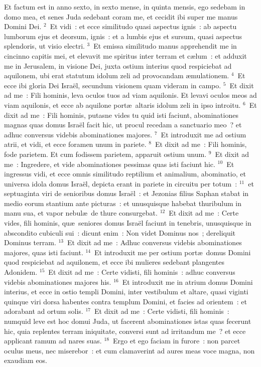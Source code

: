 \lettrine[lines=10,image=true,loversize=0.05,lraise=-0.03]{E}{}t factum est in anno sexto, in sexto mense, in quinta mensis, ego sedebam in domo mea, et senes Juda sedebant coram me, et cecidit ibi super me manus Domini Dei.
${}^{2}$~Et vidi~: et ecce similitudo quasi aspectus ignis~: ab aspectu lumborum ejus et deorsum, ignis~: et a lumbis ejus et sursum, quasi aspectus splendoris, ut visio electri.
${}^{3}$~Et emissa similitudo manus apprehendit me in cincinno capitis mei, et elevavit me spiritus inter terram et c\ae lum~: et adduxit me in Jerusalem, in visione Dei, juxta ostium interius quod respiciebat ad aquilonem, ubi erat statutum idolum zeli ad provocandam \ae mulationem.
${}^{4}$~Et ecce ibi gloria Dei Isra\"el, secundum visionem quam videram in campo.
${}^{5}$~Et dixit ad me~: Fili hominis, leva oculos tuos ad viam aquilonis. Et levavi oculos meos ad viam aquilonis, et ecce ab aquilone port\ae\ altaris idolum zeli in ipso introitu.
${}^{6}$~Et dixit ad me~: Fili hominis, putasne vides tu quid isti faciunt, abominationes magnas quas domus Isra\"el facit hic, ut procul recedam a sanctuario meo~? et adhuc conversus videbis abominationes majores.
${}^{7}$~Et introduxit me ad ostium atrii, et vidi, et ecce foramen unum in pariete.
${}^{8}$~Et dixit ad me~: Fili hominis, fode parietem. Et cum fodissem parietem, apparuit ostium unum.
${}^{9}$~Et dixit ad me~: Ingredere, et vide abominationes pessimas quas isti faciunt hic.
${}^{10}$~Et ingressus vidi, et ecce omnis similitudo reptilium et animalium, abominatio, et universa idola domus Isra\"el, depicta erant in pariete in circuitu per totum~:
${}^{11}$~et septuaginta viri de senioribus domus Isra\"el~: et Jezonias filius Saphan stabat in medio eorum stantium ante picturas~: et unusquisque habebat thuribulum in manu sua, et vapor nebul\ae\ de thure consurgebat.
${}^{12}$~Et dixit ad me~: Certe vides, fili hominis, qu\ae\ seniores domus Isra\"el faciunt in tenebris, unusquisque in abscondito cubiculi sui~: dicunt enim~: Non videt Dominus nos~; dereliquit Dominus terram.
${}^{13}$~Et dixit ad me~: Adhuc conversus videbis abominationes majores, quas isti faciunt.
${}^{14}$~Et introduxit me per ostium port\ae\ domus Domini quod respiciebat ad aquilonem, et ecce ibi mulieres sedebant plangentes Adonidem.
${}^{15}$~Et dixit ad me~: Certe vidisti, fili hominis~: adhuc conversus videbis abominationes majores his.
${}^{16}$~Et introduxit me in atrium domus Domini interius, et ecce in ostio templi Domini, inter vestibulum et altare, quasi viginti quinque viri dorsa habentes contra templum Domini, et facies ad orientem~: et adorabant ad ortum solis.
${}^{17}$~Et dixit ad me~: Certe vidisti, fili hominis~: numquid leve est hoc domui Juda, ut facerent abominationes istas quas fecerunt hic, quia replentes terram iniquitate, conversi sunt ad irritandum me~? et ecce applicant ramum ad nares suas.
${}^{18}$~Ergo et ego faciam in furore~: non parcet oculus meus, nec miserebor~: et cum clamaverint ad aures meas voce magna, non exaudiam eos.


